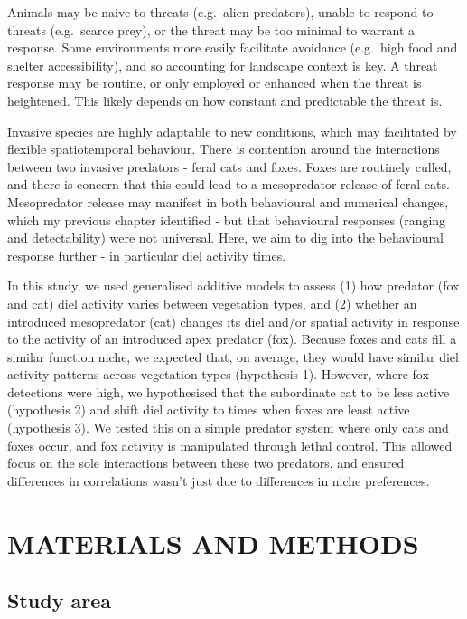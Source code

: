 \documentclass[]{elsarticle} %
\begin{document}
Animals may be naive to threats (e.g.~alien predators), unable to respond to threats (e.g.~scarce prey), or the threat may be too minimal to warrant a response. Some environments more easily facilitate avoidance (e.g.~high food and shelter accessibility), and so accounting for landscape context is key. A threat response may be routine, or only employed or enhanced when the threat is heightened. This likely depends on how constant and predictable the threat is.

Invasive species are highly adaptable to new conditions, which may facilitated by flexible spatiotemporal behaviour.
There is contention around the interactions between two invasive predators - feral cats and foxes. Foxes are routinely culled, and there is concern that this could lead to a mesopredator release of feral cats. Mesopredator release may manifest in both behavioural and numerical changes, which my previous chapter identified - but that behavioural responses (ranging and detectability) were not universal. Here, we aim to dig into the behavioural response further - in particular diel activity times.

In this study, we used generalised additive models to assess (1) how predator (fox and cat) diel activity varies between vegetation types, and (2) whether an introduced mesopredator (cat) changes its diel and/or spatial activity in response to the activity of an introduced apex predator (fox). Because foxes and cats fill a similar function niche, we expected that, on average, they would have similar diel activity patterns across vegetation types (hypothesis 1). However, where fox detections were high, we hypothesised that the subordinate cat to be less active (hypothesis 2) and shift diel activity to times when foxes are least active (hypothesis 3). We tested this on a simple predator system where only cats and foxes occur, and fox activity is manipulated through lethal control. This allowed focus on the sole interactions between these two predators, and ensured differences in correlations wasn't just due to differences in niche preferences.

\newpage

\hypertarget{materials-and-methods}{%
\section{MATERIALS AND METHODS}\label{materials-and-methods}}

\hypertarget{study-area}{%
\subsection{Study area}\label{study-area}}
\end{document}
